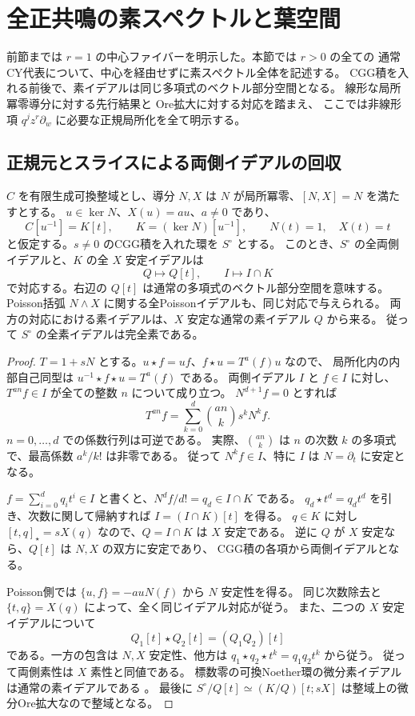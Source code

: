 \section{全正共鳴の素スペクトルと葉空間}
\label{sec:poisson-spectral-v37}

前節までは $r=1$ の中心ファイバーを明示した。本節では $r>0$ の全ての
通常CY代表について、中心を経由せずに素スペクトル全体を記述する。
CGG積を入れる前後で、素イデアルは同じ多項式のベクトル部分空間となる。
線形な局所冪零導分に対する先行結果\cite[Theorem~7.1]{LecoutreSierra2019}と
Ore拡大に対する対応\cite[Theorem~3.6]{JordanOre2014}を踏まえ、
ここでは非線形項 $q^jz^r\partial_w$ に必要な正規局所化を全て明示する。

\subsection{正規元とスライスによる両側イデアルの回収}

\begin{lemma}[非零固有重量を持つスライス]
\label{lem:normal-slice-ideals-v37}
$C$ を有限生成可換整域とし、導分 $N,X$ は
$N$ が局所冪零、$[N,X]=N$ を満たすとする。
$u\in\ker N$、$X(u)=a u$、$a\ne0$ であり、
\[
 C[u^{-1}]=K[t],\qquad K=(\ker N)[u^{-1}],\qquad
 N(t)=1,\quad X(t)=t
\]
と仮定する。$s\ne0$ のCGG積を入れた環を $S^\circ$ とする。
このとき、$S^\circ$ の全両側イデアルと、$K$ の全 $X$ 安定イデアルは
\[
 Q\longmapsto Q[t],\qquad I\longmapsto I\cap K
\]
で対応する。右辺の $Q[t]$ は通常の多項式のベクトル部分空間を意味する。
Poisson括弧 $N\wedge X$ に関する全Poissonイデアルも、同じ対応で与えられる。
両方の対応における素イデアルは、$X$ 安定な通常の素イデアル $Q$ から来る。
従って $S^\circ$ の全素イデアルは完全素である。
\end{lemma}

\begin{proof}
$T=1+sN$ とする。$u\star f=uf$、$f\star u=T^a(f)u$ なので、
局所化内の内部自己同型は $u^{-1}\star f\star u=T^a(f)$ である。
両側イデアル $I$ と $f\in I$ に対し、$T^{an}f\in I$ が全ての整数 $n$ について成り立つ。
$N^{d+1}f=0$ とすれば
\[
 T^{an}f=\sum_{k=0}^{d}\binom{an}{k}s^kN^kf.
\]
$n=0,\ldots,d$ での係数行列は可逆である。
実際、$\binom{an}{k}$ は $n$ の次数 $k$ の多項式で、最高係数 $a^k/k!$ は非零である。
従って $N^kf\in I$、特に $I$ は $N=\partial_t$ に安定となる。

$f=\sum_{i=0}^{d}q_it^i\in I$ と書くと、$N^df/d!=q_d\in I\cap K$ である。
$q_d\star t^d=q_dt^d$ を引き、次数に関して帰納すれば
$I=(I\cap K)[t]$ を得る。
$q\in K$ に対し $[t,q]_\star=sX(q)$ なので、$Q=I\cap K$ は $X$ 安定である。
逆に $Q$ が $X$ 安定なら、$Q[t]$ は $N,X$ の双方に安定であり、
CGG積の各項から両側イデアルとなる。

Poisson側では $\{u,f\}=-auN(f)$ から $N$ 安定性を得る。
同じ次数除去と $\{t,q\}=X(q)$ によって、全く同じイデアル対応が従う。
また、二つの $X$ 安定イデアルについて
\[
 Q_1[t]\star Q_2[t]=(Q_1Q_2)[t]
\]
である。一方の包含は $N,X$ 安定性、他方は
$q_1\star q_2\star t^k=q_1q_2t^k$ から従う。
従って両側素性は $X$ 素性と同値である。
標数零の可換Noether環の微分素イデアルは通常の素イデアルである
\cite[Lemma~2.3]{JordanOre2014}。
最後に $S^\circ/Q[t]\simeq(K/Q)[t;sX]$ は整域上の微分Ore拡大なので整域となる。
\end{proof}

